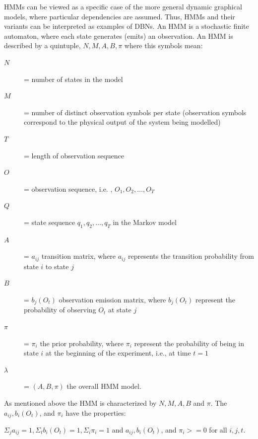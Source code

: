  HMMs can be viewed as a specific case of the more general dynamic graphical models, where particular dependencies are assumed. Thus, HMMs and their variants can be interpreted as examples of DBNs.
An HMM is a stochastic finite automaton, where each state generates (emits) an observation.
An HMM is described by a quintuple, ${N , M , A , B , \pi}$ where this symbols mean:
\begin{description}
\item[$N$] = number of states in the model
\item[$M$] = number of distinct observation symbols per state (observation symbols correspond to the physical output of the system being modelled)
\item[$T$] = length of observation sequence
\item[$O$] = observation sequence, i.e. , $O_1,O_2,…,O_T$
\item[$Q$]  = state sequence $q_1,q_2,…,q_T$ in the Markov model
\item[$A$] = ${a_{ij}}$ transition matrix, where $a_{ij}$ represents the transition probability from state $i$ to state $j$
\item[$B$] = ${b_j (O_t)}$ observation emission matrix, where $b_j (O_t)$ represent the probability of observing $O_t$ at state $j$
\item[$\pi$] = ${\pi_i}$ the prior probability, where $\pi_i$ represent the probability of being in state $i$ at the beginning of the
 experiment, i.e., at time $t=1$
\item[$\lambda$] = $(A,B,\pi)$ the overall HMM model.
\end{description}

As mentioned above the HMM is characterized by $N, M, A, B$ and $\pi$. The $a_{ij}, b_i (O_t)$, and $\pi_i$ have the properties:

 $ \Sigma_j a_{ij} = 1, \Sigma_t  b_i (O_t) = 1, \Sigma_i \pi_i = 1$ and  $a_{ij}, b_i (O_t)$, and $\pi_i >= 0$ for all $i,j,t$.

\cleardoublepage